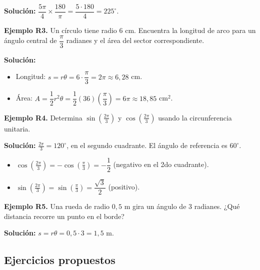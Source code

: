 \documentclass[12pt, a4paper]{article}
\begin{document}
  \begin{cuadrosolucion}
    \textbf{Solución:} $\dfrac{5\pi}{4} \times \dfrac{180}{\pi} = \dfrac{5 \cdot 180}{4} = 225^\circ$.
  \end{cuadrosolucion}

  \textbf{Ejemplo R3.} Un círculo tiene radio $6$ cm. Encuentra la longitud de arco para un ángulo central de $\dfrac{\pi}{3}$ radianes y el área del sector correspondiente.

  \begin{cuadrosolucion}
    \textbf{Solución:}
    \begin{itemize}
      \item Longitud: $s = r\theta = 6 \cdot \dfrac{\pi}{3} = 2\pi \approx 6{,}28$ cm.
      \item Área: $A = \dfrac{1}{2}r^2\theta = \dfrac{1}{2}(36)\left(\dfrac{\pi}{3}\right) = 6\pi \approx 18{,}85$ cm$^2$.
    \end{itemize}
  \end{cuadrosolucion}

  \textbf{Ejemplo R4.} Determina $\sin\left(\frac{2\pi}{3}\right)$ y $\cos\left(\frac{2\pi}{3}\right)$ usando la circunferencia unitaria.

  \begin{cuadrosolucion}
    \textbf{Solución:} $\frac{2\pi}{3} = 120^\circ$, en el segundo cuadrante. El ángulo de referencia es $60^\circ$.
    \begin{itemize}
      \item $\cos\left(\frac{2\pi}{3}\right) = -\cos\left(\frac{\pi}{3}\right) = -\dfrac{1}{2}$ (negativo en el 2do cuadrante).
      \item $\sin\left(\frac{2\pi}{3}\right) = \sin\left(\frac{\pi}{3}\right) = \dfrac{\sqrt{3}}{2}$ (positivo).
    \end{itemize}
  \end{cuadrosolucion}

  \textbf{Ejemplo R5.} Una rueda de radio $0{,}5$ m gira un ángulo de $3$ radianes. ¿Qué distancia recorre un punto en el borde?

  \begin{cuadrosolucion}
    \textbf{Solución:} $s = r\theta = 0{,}5 \cdot 3 = 1{,}5$ m.
  \end{cuadrosolucion}

  \newpage

  \subsection{Ejercicios propuestos}
\end{document}
